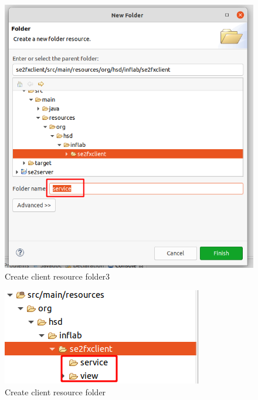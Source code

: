 \documentclass[11pt]{scrartcl}
\begin{document}
\newpage
\begin{figure}[!ht]
    \includegraphics[width=\linewidth]{images/eclipse22_client_resource_folder3.png}
    \caption{Create client resource folder3}
    \label{fig:createclientresourcefolder3}
\end{figure}

\newpage
\begin{figure}[!ht]
    \includegraphics[width=\linewidth]{images/eclipse22_client_resource_folder.png}
    \caption{Create client resource folder}
    \label{fig:createclientresourcefolder}
\end{figure}

\newpage
\end{document}
